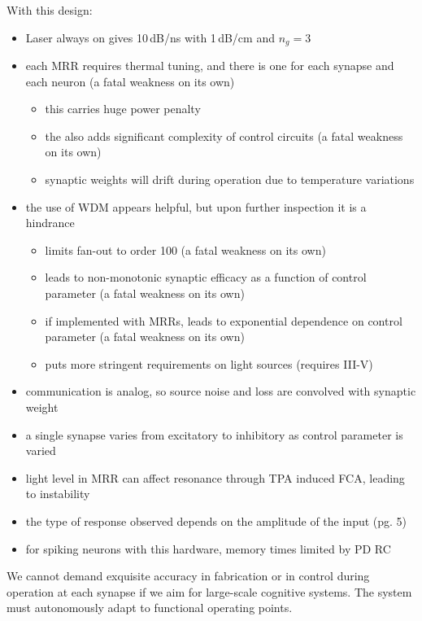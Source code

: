 \cite{tafe2019}
With this design:
\begin{itemize}
\item Laser always on gives 10\,dB/ns with 1\,dB/cm and $n_g = 3$
\item each MRR requires thermal tuning, and there is one for each synapse and each neuron (a fatal weakness on its own)
\begin{itemize}
\item this carries huge power penalty
\item the also adds significant complexity of control circuits (a fatal weakness on its own)
\item synaptic weights will drift during operation due to temperature variations
\end{itemize}
\item the use of WDM appears helpful, but upon further inspection it is a hindrance
\begin{itemize}
\item limits fan-out to order 100 (a fatal weakness on its own)
\item leads to non-monotonic synaptic efficacy as a function of control parameter (a fatal weakness on its own)
\item if implemented with MRRs, leads to exponential dependence on control parameter (a fatal weakness on its own)
\item puts more stringent requirements on light sources (requires III-V)
\end{itemize}
\item communication is analog, so source noise and loss are convolved with synaptic weight
\item a single synapse varies from excitatory to inhibitory as control parameter is varied
\item light level in MRR can affect resonance through TPA induced FCA, leading to instability
\item the type of response observed depends on the amplitude of the input (pg. 5)
\item for spiking neurons with this hardware, memory times limited by PD RC
\end{itemize}

\vspace{3em}
We cannot demand exquisite accuracy in fabrication or in control during operation at each synapse if we aim for large-scale cognitive systems. The system must autonomously adapt to functional operating points.


